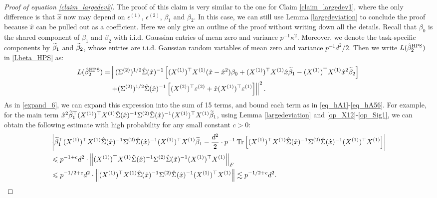  \begin{proof}[Proof of equation \eqref{claim_largedev2}]
 The proof of this claim is very similar to the one for Claim \ref{claim_largedev1}, where the only difference is that $\hat x$ now may depend on $\epsilon^{(1)}$, $\epsilon^{(2)}$, $\beta_1$ and $\beta_2$. In this case, we can still use  Lemma \ref{largedeviation} to conclude the proof because $\hat x$ can be pulled out as a coefficient. Here we only give an outline of the proof without writing down all the details. Recall that $\beta_0$ is the shared component of $\beta_1$ and $\beta_2$ with i.i.d. Gaussian entries of mean zero and variance $p^{-1}\kappa^2$. Moreover, we denote the task-specific components by $\widetilde\beta_1$ and $\widetilde\beta_2$, whose entries are i.i.d. Gaussian random variables of mean zero and variance $p^{-1} d^2 / 2$. Then we write $L(\hat{\beta}_2^{\textup{HPS}}) $ in \eqref{Lbeta_HPS} as:
 \begin{align}
L(\hat{\beta}_2^{\textup{HPS}})  =&  \left\| (\Sigma^{(2)})^{1/2}\hat \Sigma(\hat x)^{-1} \left[(X^{(1)})^\top X^{(1)} (\hat x -\hat x^2)\beta_0+(X^{(1)})^\top X^{(1)} \hat x\widetilde \beta_1 - (X^{(1)})^\top X^{(1)}  \hat x^2\widetilde \beta_2 \right] \right. \nonumber\\
&\left. + (\Sigma^{(2)})^{1/2}\hat \Sigma(\hat x)^{-1}\left[ (X^{(2)})^\top \varepsilon^{(2)} + \hat x   (X^{(1)})^\top \varepsilon^{(1)} \right]\right\|^2. \label{expand_15}
\end{align}
As in \eqref{expand_6}, we can expand this expression into the sum of 15 terms, and bound each term as in \eqref{eq_hA1}-\eqref{eq_hA56}. For example, for the main term $\hat x^2 \widetilde \beta_1^\top (X^{(1)})^\top X^{(1)} \hat \Sigma(\hat x)^{-1}  \Sigma^{(2)} \hat \Sigma(\hat x)^{-1}  (X^{(1)})^\top X^{(1)}\widetilde\beta_1$, using 
Lemma \ref{largedeviation} and \eqref{op_X12}-\eqref{op_Sig1}, we can obtain the following estimate with high probability for any small constant $c>0$:
\begin{align*}
&  \left|\wt \beta_1^\top (X^{(1)})^\top X^{(1)} \hat \Sigma(\hat x)^{-1}  \Sigma^{(2)} \hat \Sigma(\hat x)^{-1}  (X^{(1)})^\top X^{(1)}\wt\beta_1 - \frac{d^2}{2} \cdot p^{-1}\bigtr{(X^{(1)})^\top X^{(1)} \hat \Sigma(\hat x)^{-1}  \Sigma^{(2)} \hat \Sigma(\hat x)^{-1}  (X^{(1)})^\top X^{(1)}}\right| \\
&\le p^{-1+c}d^2 \cdot \left\| (X^{(1)})^\top X^{(1)} \hat \Sigma(\hat x)^{-1}  \Sigma^{(2)} \hat \Sigma(\hat x)^{-1}  (X^{(1)})^\top X^{(1)} \right\|_F \\
&\le p^{-1/2+c}d^2 \cdot  \left\| (X^{(1)})^\top X^{(1)} \hat \Sigma(\hat x)^{-1}  \Sigma^{(2)} \hat \Sigma(\hat x)^{-1}  (X^{(1)})^\top X^{(1)} \right\|  \lesssim p^{-1/2+c}d^2.

\end{align*}
\end{proof}
